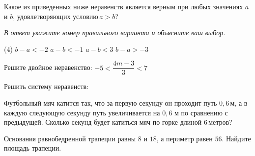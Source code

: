 \begin{homework}[number=2]
	\begin{listofex}
		\item Какое из приведенных ниже неравенств является верным при любых значениях \( a \) и \( b \), удовлетворяющих условию \( a > b \)?
		
		\textit{В ответ укажите номер правильного варианта и объясните ваш выбор.}
		\begin{tasks}(4)
			\task \( b-a < -2 \)
			\task \( a-b < -1 \)
			\task \( a-b < 3 \)
			\task \( b-a > -3 \)
		\end{tasks}
		\item {}
		\item Решите двойное неравенство: \( -5<\dfrac{4m-3}{3}<7 \)
		\item Решить систему неравенств:
		\begin{itasks}[2]
			\task {}
			\task {}
		\end{itasks}
		\item Футбольный мяч катится так, что за первую секунду он проходит путь \( 0,6 \) м, а в каждую следующую секунду путь увеличивается на \( 0,6  \) м по сравнению с предыдущей. Сколько секунд будет катиться мяч по горке длиной 6 метров?
		\item Основания равнобедренной трапеции равны \( 8 \) и \( 18 \), а периметр равен \( 56 \). Найдите площадь трапеции.
	\end{listofex}
\end{homework}
%
%
